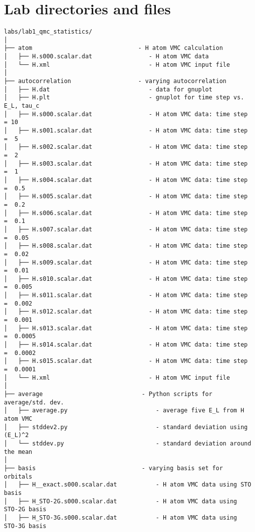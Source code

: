 \section{Lab directories and files}

\footnotesize
\begin{verbatim}
labs/lab1_qmc_statistics/
│
├── atom                              - H atom VMC calculation
│   ├── H.s000.scalar.dat                - H atom VMC data 
│   └── H.xml                            - H atom VMC input file
│
├── autocorrelation                   - varying autocorrelation
│   ├── H.dat                            - data for gnuplot
│   ├── H.plt                            - gnuplot for time step vs. E_L, tau_c
│   ├── H.s000.scalar.dat                - H atom VMC data: time step = 10 
│   ├── H.s001.scalar.dat                - H atom VMC data: time step =  5 
│   ├── H.s002.scalar.dat                - H atom VMC data: time step =  2 
│   ├── H.s003.scalar.dat                - H atom VMC data: time step =  1 
│   ├── H.s004.scalar.dat                - H atom VMC data: time step =  0.5
│   ├── H.s005.scalar.dat                - H atom VMC data: time step =  0.2
│   ├── H.s006.scalar.dat                - H atom VMC data: time step =  0.1
│   ├── H.s007.scalar.dat                - H atom VMC data: time step =  0.05 
│   ├── H.s008.scalar.dat                - H atom VMC data: time step =  0.02
│   ├── H.s009.scalar.dat                - H atom VMC data: time step =  0.01
│   ├── H.s010.scalar.dat                - H atom VMC data: time step =  0.005
│   ├── H.s011.scalar.dat                - H atom VMC data: time step =  0.002
│   ├── H.s012.scalar.dat                - H atom VMC data: time step =  0.001
│   ├── H.s013.scalar.dat                - H atom VMC data: time step =  0.0005
│   ├── H.s014.scalar.dat                - H atom VMC data: time step =  0.0002
│   ├── H.s015.scalar.dat                - H atom VMC data: time step =  0.0001
│   └── H.xml                            - H atom VMC input file
│
├── average                            - Python scripts for average/std. dev.
│   ├── average.py                         - average five E_L from H atom VMC
│   ├── stddev2.py                         - standard deviation using (E_L)^2
│   └── stddev.py                          - standard deviation around the mean
│
├── basis                              - varying basis set for orbitals
│   ├── H__exact.s000.scalar.dat           - H atom VMC data using STO basis
│   ├── H_STO-2G.s000.scalar.dat           - H atom VMC data using STO-2G basis
│   ├── H_STO-3G.s000.scalar.dat           - H atom VMC data using STO-3G basis

\end{verbatim}
